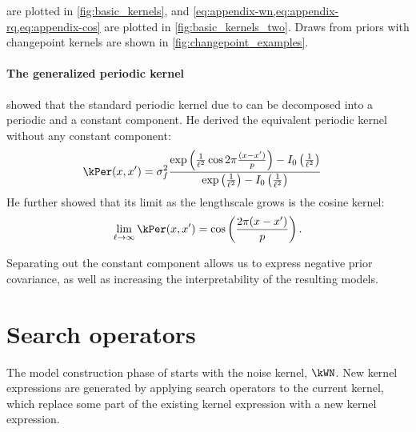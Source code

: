  are plotted in \cref{fig:basic_kernels}, and \cref{eq:appendix-wn,eq:appendix-rq,eq:appendix-cos} are plotted in \cref{fig:basic_kernels_two}.
Draws from \gp{} priors with changepoint kernels are shown in \cref{fig:changepoint_examples}.



\subsubsection{The generalized periodic kernel}

\citet{lloyd-periodic} showed that the standard periodic kernel due to \citet{mackay1998introduction} can be decomposed into a periodic and a constant component.
He derived the equivalent periodic kernel without any constant component:
%
\begin{align}
\kPer(\inputVar, \inputVar') & =  \sigma_f^2 \frac{\exp\left(\frac{1}{\ell^2}\cos 2 \pi  \frac{(\inputVar - \inputVar')}{p}\right) - I_0\left(\frac{1}{\ell^2}\right)}{\exp\left(\frac{1}{\ell^2}\right) - I_0\left(\frac{1}{\ell^2}\right)} \label{eq:generalized-periodic}
\end{align}
He further showed that its limit as the lengthscale grows is the cosine kernel:
\begin{equation}
\lim_{\ell \to \infty} \kPer(x, x') = \cos\left(\frac{2 \pi (x - x')}{p}\right).
\end{equation}

Separating out the constant component allows us to express negative prior covariance, as well as increasing the interpretability of the resulting models.






\chapter{Search operators}
\label{ch:appendix-search}
\label{sec:search-operators}


The model construction phase of \procedurename{} starts with the noise kernel, $\kWN$.
New kernel expressions are generated by applying search operators to the current kernel, which replace some part of the existing kernel expression with a new kernel expression.

